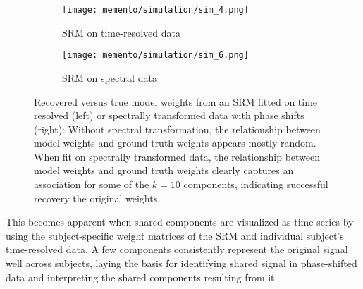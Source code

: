 \begin{figure}[H]
	\centering
	\begin{subfigure}{0.35\textwidth}
		\texttt{[image: memento/simulation/sim\_4.png]}
		\caption{SRM on time-resolved data}
		\label{fig:sim-timeresolved-weights}
	\end{subfigure}
	\begin{subfigure}{0.35\textwidth}
		\texttt{[image: memento/simulation/sim\_6.png]}
		\caption{SRM on spectral data}
		\label{fig:sim-spectral-weights}
	\end{subfigure}
	\caption[Relationship of model weights and true weights]{Recovered versus true model weights from an \gls{SRM} fitted on time resolved (left) or spectrally transformed data with phase shifts (right): Without spectral transformation, the relationship between model weights and ground truth weights appears mostly random. When fit on spectrally transformed data, the relationship between model weights and ground truth weights clearly captures an association for some of the $k=10$ components, indicating successful recovery the original weights.}
	\label{fig:sim-weights}
\end{figure}


This becomes apparent when shared components are visualized as time series by using the subject-specific weight matrices of the \gls{SRM} and individual subject's time-resolved data.
A few components consistently represent the original signal well across subjects, laying the basis for identifying shared signal in phase-shifted data and interpreting the shared components resulting from it.




